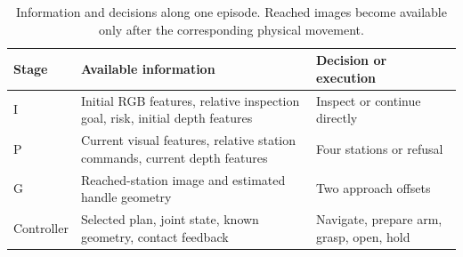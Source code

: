 \begin{table}[H]
\caption{Information and decisions along one episode. Reached images become
available only after the corresponding physical movement.}
\label{tab:information}
\centering\small
\begin{tabularx}{\linewidth}{@{}lXX@{}}
\toprule
Stage & Available information & Decision or execution \\
\midrule
I & Initial RGB features, relative inspection goal, risk, initial depth features
  & Inspect or continue directly \\
P & Current visual features, relative station commands, current depth features
  & Four stations or refusal \\
G & Reached-station image and estimated handle geometry
  & Two approach offsets \\
Controller & Selected plan, joint state, known geometry, contact feedback
  & Navigate, prepare arm, grasp, open, hold \\
\bottomrule
\end{tabularx}
\end{table}
